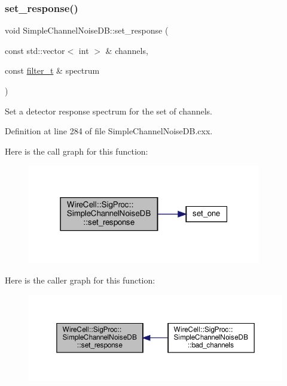 \subsubsection{\texorpdfstring{set\+\_\+response()}{set\_response()}}
{\footnotesize\ttfamily void Simple\+Channel\+Noise\+D\+B\+::set\+\_\+response (\begin{DoxyParamCaption}\item[{const std\+::vector$<$ int $>$ \&}]{channels,  }\item[{const \hyperlink{class_wire_cell_1_1_i_channel_noise_database_a0acbae29743542eb1c652f7a56e692f5}{filter\+\_\+t} \&}]{spectrum }\end{DoxyParamCaption})}



Set a detector response spectrum for the set of channels. 



Definition at line 284 of file Simple\+Channel\+Noise\+D\+B.\+cxx.

Here is the call graph for this function\+:
\nopagebreak
\begin{figure}[H]
\begin{center}
\leavevmode
\includegraphics[width=289pt]{class_wire_cell_1_1_sig_proc_1_1_simple_channel_noise_d_b_ae5a4c212b9589940124fcce6075f8996_cgraph}
\end{center}
\end{figure}
Here is the caller graph for this function\+:
\nopagebreak
\begin{figure}[H]
\begin{center}
\leavevmode
\includegraphics[width=350pt]{class_wire_cell_1_1_sig_proc_1_1_simple_channel_noise_d_b_ae5a4c212b9589940124fcce6075f8996_icgraph}
\end{center}
\end{figure}
\mbox{\label{class_wire_cell_1_1_sig_proc_1_1_simple_channel_noise_d_b_adce8a777da71112d25e077a610de2a94}} 
